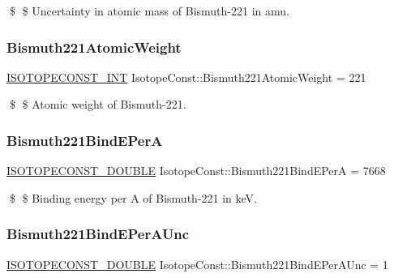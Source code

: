 \$ \$ Uncertainty in atomic mass of Bismuth-\/221 in amu. \mbox{\label{group___isotope_const-_bismuth-_bi221_gafa34a4da4af1f589238cf713fa30fe61}} 
\subsubsection{\texorpdfstring{Bismuth221\+Atomic\+Weight}{Bismuth221AtomicWeight}}
{\footnotesize\ttfamily \mbox{\hyperlink{group___isotope_const-_macros_ga5f18360b3e99483a35c32d789e62621c}{I\+S\+O\+T\+O\+P\+E\+C\+O\+N\+S\+T\+\_\+\+I\+NT}} Isotope\+Const\+::\+Bismuth221\+Atomic\+Weight = 221}

\$ \$ Atomic weight of Bismuth-\/221. \mbox{\label{group___isotope_const-_bismuth-_bi221_ga2b63c3618c1d0d15e2c737ab83e86ae0}} 
\subsubsection{\texorpdfstring{Bismuth221\+Bind\+E\+PerA}{Bismuth221BindEPerA}}
{\footnotesize\ttfamily \mbox{\hyperlink{group___isotope_const-_macros_ga8f45a7272ce02c0b4c65c44636ed719a}{I\+S\+O\+T\+O\+P\+E\+C\+O\+N\+S\+T\+\_\+\+D\+O\+U\+B\+LE}} Isotope\+Const\+::\+Bismuth221\+Bind\+E\+PerA = 7668}

\$ \$ Binding energy per A of Bismuth-\/221 in keV. \mbox{\label{group___isotope_const-_bismuth-_bi221_gaca2caa5eaa467ab4b63b5ee566c60639}} 
\subsubsection{\texorpdfstring{Bismuth221\+Bind\+E\+Per\+A\+Unc}{Bismuth221BindEPerAUnc}}
{\footnotesize\ttfamily \mbox{\hyperlink{group___isotope_const-_macros_ga8f45a7272ce02c0b4c65c44636ed719a}{I\+S\+O\+T\+O\+P\+E\+C\+O\+N\+S\+T\+\_\+\+D\+O\+U\+B\+LE}} Isotope\+Const\+::\+Bismuth221\+Bind\+E\+Per\+A\+Unc = 1}

